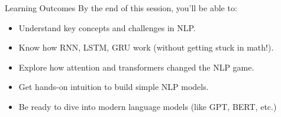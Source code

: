 \begin{frame}{Learning Outcomes}
By the end of this session, you'll be able to:
\begin{itemize}
    \item Understand key concepts and challenges in NLP.
    \item Know how RNN, LSTM, GRU work (without getting stuck in math!).
    \item Explore how attention and transformers changed the NLP game.
    \item Get hands-on intuition to build simple NLP models.
    \item Be ready to dive into modern language models (like GPT, BERT, etc.)
\end{itemize}
\end{frame}